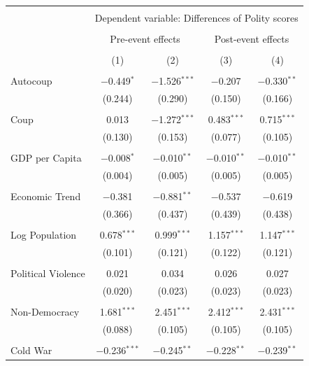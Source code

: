 \documentclass[
  12pt,
]{report}
\begin{document}
\begin{table}
{\begin{tabular}{@{\extracolsep{30pt}}lcccc} 
\\[-1.8ex]\hline 
\hline \\[-1.8ex] 
 & \multicolumn{4}{c}{Dependent variable: Differences of Polity scores} \\ 
\cline{2-5} 
\\[-1.8ex] & \multicolumn{2}{c}{Pre-event effects} & \multicolumn{2}{c}{Post-event effects} \\ 
\\[-1.8ex] & (1) & (2) & (3) & (4)\\ 
\hline \\[-1.8ex] 
 Autocoup & $-$0.449$^{*}$ & $-$1.526$^{***}$ & $-$0.207 & $-$0.330$^{**}$ \\ 
  & (0.244) & (0.290) & (0.150) & (0.166) \\ 
  & & & & \\ 
 Coup & 0.013 & $-$1.272$^{***}$ & 0.483$^{***}$ & 0.715$^{***}$ \\ 
  & (0.130) & (0.153) & (0.077) & (0.105) \\ 
  & & & & \\ 
 GDP per Capita & $-$0.008$^{*}$ & $-$0.010$^{**}$ & $-$0.010$^{**}$ & $-$0.010$^{**}$ \\ 
  & (0.004) & (0.005) & (0.005) & (0.005) \\ 
  & & & & \\ 
 Economic Trend & $-$0.381 & $-$0.881$^{**}$ & $-$0.537 & $-$0.619 \\ 
  & (0.366) & (0.437) & (0.439) & (0.438) \\ 
  & & & & \\ 
 Log Population & 0.678$^{***}$ & 0.999$^{***}$ & 1.157$^{***}$ & 1.147$^{***}$ \\ 
  & (0.101) & (0.121) & (0.122) & (0.121) \\ 
  & & & & \\ 
 Political Violence & 0.021 & 0.034 & 0.026 & 0.027 \\ 
  & (0.020) & (0.023) & (0.023) & (0.023) \\ 
  & & & & \\ 
 Non-Democracy & 1.681$^{***}$ & 2.451$^{***}$ & 2.412$^{***}$ & 2.431$^{***}$ \\ 
  & (0.088) & (0.105) & (0.105) & (0.105) \\ 
  & & & & \\ 
 Cold War & $-$0.236$^{***}$ & $-$0.245$^{**}$ & $-$0.228$^{**}$ & $-$0.239$^{**}$ \\ 

\end{tabular}}
\end{table}
\end{document}
